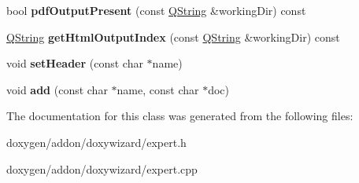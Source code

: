 \begin{DoxyCompactItemize}
\mbox{\label{class_expert_a77e5910327db376865ffdeda453be8cc}} 
bool {\bfseries pdf\+Output\+Present} (const \mbox{\hyperlink{class_q_string}{Q\+String}} \&working\+Dir) const
\item 
\mbox{\label{class_expert_a579dc1e16a385cf0884c1e91186b6350}} 
\mbox{\hyperlink{class_q_string}{Q\+String}} {\bfseries get\+Html\+Output\+Index} (const \mbox{\hyperlink{class_q_string}{Q\+String}} \&working\+Dir) const
\item 
\mbox{\label{class_expert_afc6094b6a7d6d75bf25949cd55a6558b}} 
void {\bfseries set\+Header} (const char $\ast$name)
\item 
\mbox{\label{class_expert_a6edd421940102d25c90ec403c44de6ea}} 
void {\bfseries add} (const char $\ast$name, const char $\ast$doc)
\end{DoxyCompactItemize}


The documentation for this class was generated from the following files\+:\begin{DoxyCompactItemize}
\item 
doxygen/addon/doxywizard/expert.\+h\item 
doxygen/addon/doxywizard/expert.\+cpp\end{DoxyCompactItemize}
